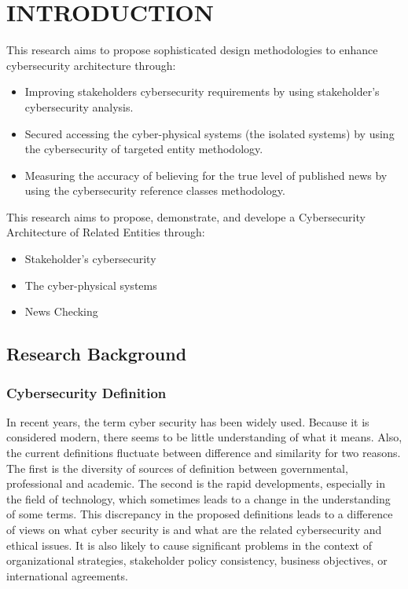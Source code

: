 \chapter{INTRODUCTION}

\if 
This research aims to propose sophisticated design methodologies to enhance cybersecurity architecture through:
\begin{itemize}
\item Improving stakeholders cybersecurity requirements by using stakeholder's cybersecurity analysis.
\item Secured accessing
the cyber-physical systems (the isolated systems) by using the cybersecurity of targeted entity methodology.
\item Measuring the accuracy of believing for the true level of published news by using the cybersecurity reference classes methodology. 
\end{itemize} \fi
\if
This research aims to propose,  demonstrate, and develope a Cybersecurity Architecture of Related Entities through:
\begin{itemize}
\item Stakeholder's cybersecurity  %
\item  The cyber-physical systems %
\item  News Checking %
\end{itemize}
\fi


\section{Research Background}
\subsection{Cybersecurity Definition}
In recent years, the term cyber security has been widely used\cite{craigen2014defining,schatz2017towards,giles2013divided}. Because it is considered modern, there seems to be little understanding of what it means. Also, the current definitions fluctuate between difference and similarity for two reasons\cite{schatz2017towards}. The first is the diversity of sources of definition between governmental, professional and academic. The second is the rapid developments, especially in the field of technology, which sometimes leads to a change in the understanding of some terms. This discrepancy in the proposed definitions leads to a difference of views on what cyber security is and what are the related cybersecurity and ethical issues. It is also likely to cause significant problems in the context of organizational strategies, stakeholder policy consistency, business objectives, or international agreements. 

